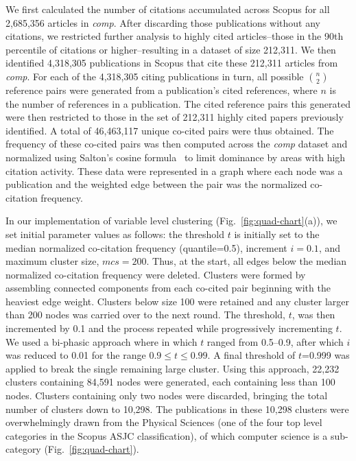 We first calculated the number of citations accumulated across Scopus for all 2,685,356 articles in \emph{comp}. After discarding those publications without any citations, we restricted further analysis to highly cited articles--those in the 90th percentile of citations or higher--resulting in a dataset of size 212,311. We then identified 4,318,305 publications in Scopus that cite these 212,311 articles from \emph{comp}. For each of the 4,318,305 citing publications in turn, all possible ${n \choose 2}$ reference pairs were generated from a publication's cited references, where $n$ is the number of references in a publication. The cited reference pairs this generated were then restricted to those in the set of 212,311 highly cited papers previously identified. A total of 46,463,117 unique co-cited pairs were thus obtained. 
The frequency of these co-cited pairs was then computed across the \emph{comp} dataset  and normalized using Salton's cosine formula~\cite{salton_citation_1979} to limit dominance by areas with high citation activity. These data were represented in a graph where each node was a publication and the weighted edge between the pair was the normalized co-citation frequency. \par 

In our implementation of variable level clustering (Fig.~\ref{fig:quad-chart}(a)), 
we set initial parameter values as follows: the threshold  $t$  is initially set to  the median normalized co-citation frequency (quantile=0.5), increment $i = 0.1$, and maximum cluster size, $mcs=200$. Thus, at the start, all edges below the median normalized co-citation frequency were deleted. Clusters were formed by assembling connected components from each co-cited pair beginning with the heaviest edge weight. Clusters below size 100 were retained and any cluster larger than 200 nodes was carried over to the next round. The threshold, $t$, was then incremented by 0.1 and the process repeated while progressively incrementing $t$.  We used a bi-phasic approach where in which $t$ ranged from 0.5--0.9, after which $i$ was reduced to 0.01 for the range $0.9 \leq t \leq 0.99$. A final threshold of $t$=0.999 was applied to break the single remaining large cluster.  Using this approach, 22,232 clusters containing 84,591 nodes were generated, each containing less than 100 nodes. Clusters containing only two nodes were discarded, bringing the total number of clusters down to 10,298. The publications in these 10,298 clusters were overwhelmingly drawn from the Physical Sciences (one of the four top level categories in the Scopus ASJC classification), of which computer science is a sub-category (Fig.~\ref{fig:quad-chart}).

